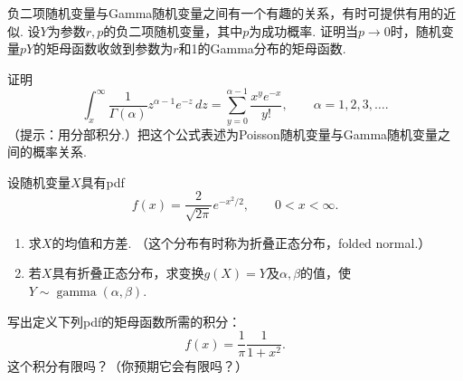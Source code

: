 \begin{exercise}\label{exercise:3.18}
负二项随机变量与Gamma随机变量之间有一个有趣的关系，有时可提供有用的近似. 设$Y$为参数$r,p$的负二项随机变量，其中$p$为成功概率. 证明当$p\to0$时，随机变量$pY$的矩母函数收敛到参数为$r$和1的Gamma分布的矩母函数.
\end{exercise}
\begin{exercise}\label{exercise:3.19}
证明
$$\int_x^\infty\frac1{\Gamma(\alpha)}z^{\alpha-1}e^{-z}\,dz=\sum_{y=0}^{\alpha-1}\frac{x^ye^{-x}}{y!},\qquad\alpha=1,2,3,\ldots.$$
（提示：用分部积分.）把这个公式表述为Poisson随机变量与Gamma随机变量之间的概率关系.
\end{exercise}
\begin{exercise}\label{exercise:3.20}
设随机变量$X$具有pdf
$$f(x)=\frac2{\sqrt{2\pi}}e^{-x^2/2},\qquad0<x<\infty.$$
\begin{enumerate}
\item[(a)] 求$X$的均值和方差. （这个分布有时称为折叠正态分布，folded normal.）
\item[(b)] 若$X$具有折叠正态分布，求变换$g(X)=Y$及$\alpha,\beta$的值，使$Y\sim\operatorname{gamma}(\alpha,\beta)$.
\end{enumerate}
\end{exercise}
\begin{exercise}\label{exercise:3.21}
写出定义下列pdf的矩母函数所需的积分：
$$f(x)=\frac1\pi\frac1{1+x^2}.$$
这个积分有限吗？（你预期它会有限吗？）
\end{exercise}

